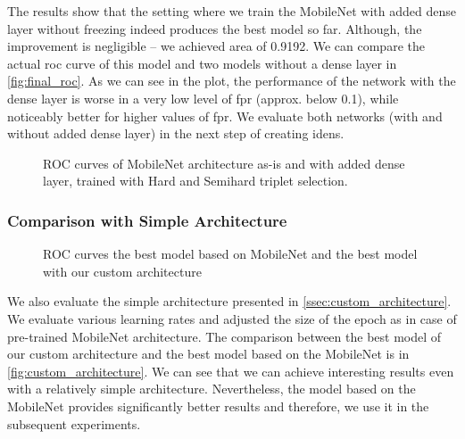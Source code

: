 The results show that the setting where we train the MobileNet with added dense layer without freezing indeed produces the best model so far. Although, the improvement is negligible -- we achieved area of 0.9192. We can compare the actual \gls{roc} curve of this model and two models without a dense layer in \autoref{fig:final_roc}. As we can see in the plot, the performance of the network with the dense layer is worse in a very low level of \gls{fpr} (approx. below 0.1), while noticeably better for higher values of \gls{fpr}. We evaluate both networks (with and without added dense layer) in the next step of creating \glspl{iden}.


\begin{figure}
    \centering
    \def\svgwidth{\columnwidth}
    
    \caption[ROC curves of MobileNet architecture with various alterations]{ROC curves of MobileNet architecture as-is and with added dense layer, trained with Hard and Semihard triplet selection.}
    \label{fig:final_roc}
\end{figure}


\subsubsection{Comparison with Simple Architecture}

\begin{figure}
    \centering
    \def\svgwidth{\columnwidth}
    
    \caption{ROC curves the best model based on MobileNet and the best model with our custom architecture}
    \label{fig:custom_architecture}
\end{figure}

We also evaluate the simple architecture presented in \autoref{ssec:custom_architecture}. We evaluate various learning rates and adjusted the size of the epoch as in case of pre-trained MobileNet architecture. The comparison between the best model of our custom architecture and the best model based on the MobileNet is in \autoref{fig:custom_architecture}. We can see that we can achieve interesting results even with a relatively simple architecture. Nevertheless, the model based on the MobileNet provides significantly better results and therefore, we use it in the subsequent experiments.


